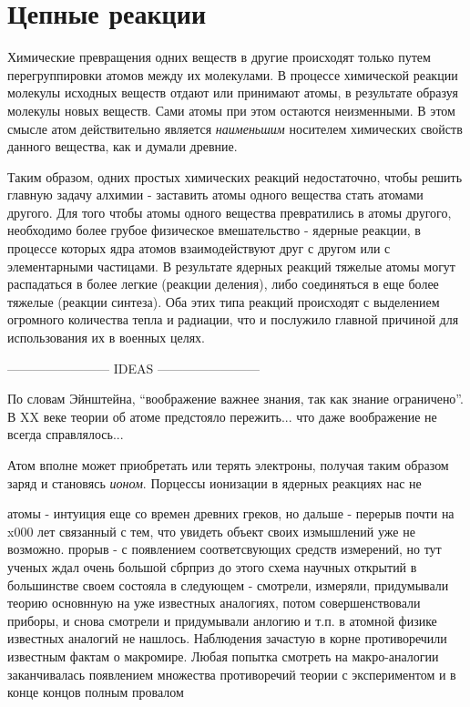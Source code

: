 \section*{Цепные реакции}

Химические превращения одних веществ в другие происходят только путем перегруппировки атомов между их молекулами.
В процессе химической реакции молекулы исходных веществ отдают или принимают атомы, в результате образуя молекулы новых веществ. 
Сами атомы при этом остаются неизменными.
В этом смысле атом действительно является \textit{наименьшим} носителем химических свойств данного вещества, как и думали древние.

Таким образом, одних простых химических реакций недостаточно, чтобы решить главную задачу алхимии - заставить атомы одного вещества стать атомами другого.
Для того чтобы атомы одного вещества превратились в атомы другого, необходимо более грубое физическое вмешательство - ядерные реакции, в процессе которых ядра атомов взаимодействуют друг с другом или с элементарными частицами.
В результате ядерных реакций тяжелые атомы могут распадаться в более легкие (реакции деления), либо соединяться в еще более тяжелые (реакции синтеза).
Оба этих типа реакций происходят с выделением огромного количества тепла и радиации, что и послужило главной причиной для использования их в военных целях.




------------------------ IDEAS ------------------------ 

По словам Эйнштейна, ``воображение важнее знания, так как знание ограничено''.
В XX веке теории об атоме предстояло пережить... что даже воображение не всегда справлялось...


Атом вполне может приобретать или терять электроны, получая таким образом заряд и становясь \textit{ионом}.
Порцессы ионизации в ядерных реакциях нас не 



атомы - интуиция еще со времен древних греков, но дальше - перерыв почти на x000 лет связанный с тем, что увидеть объект своих измышлений уже не возможно.
прорыв - с появлением соответсвующих средств измерений, но тут ученых ждал очень большой сбрприз
до этого схема научных открытий в большинстве своем состояла в следующем - смотрели, измеряли, придумывали теорию основнную на уже известных аналогиях, потом совершенствовали приборы, и снова смотрели и придумывали анлогию и т.п.
в атомной физике известных аналогий не нашлось. Наблюдения зачастую в корне противоречили известным фактам о макромире. Любая попытка смотреть на макро-аналогии заканчивалась появлением множества противоречий теории с экспериментом и в конце концов полным провалом 


